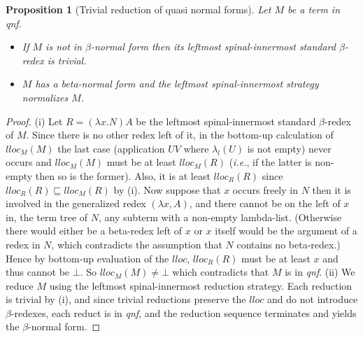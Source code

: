 \documentclass[xchauthor,chkrefs,GCNS,amsmath,amsthm,rotating,leaveRGB]{tcsg}
\theoremstyle{plain}
\newtheorem{proposition}[theorem]{Proposition}
\theoremstyle{definition}
\begin{document}
\begin{proposition}[Trivial reduction of quasi normal forms]\label{prop:qnf_nf}
Let $M$ be a term in \emph{qnf}.
%
\begin{itemize}[\textit{(ii)}]
\item[\textit{(i)}] If $M$ is not in $\beta $-normal form then its \emph{leftmost
    spinal-innermost standard $\beta $-redex} is trivial.
\item[\textit{(ii)}] $M$ has a beta-normal form and the leftmost spinal-innermost
    strategy normalizes $M$.
\end{itemize}
\end{proposition}

\begin{proof}
(i) Let $R = (\lambda x . N) A$ be the leftmost spinal-innermost standard
$\beta $-redex of $M$. Since there is no other redex left of it, in the
bottom-up calculation of $lloc_{M}(M)$ the last case (application $UV$ where
$\lambda _{l}(U)$ is not empty) never occurs and $lloc_{M}(M)$  must be at
least $lloc_{M}(R)$ (\textit{i.e.}, if the latter is non-empty then so is the
former). Also, it is at least $lloc_{R}(R)$ since $lloc_{R}(R) \sqsubseteq
lloc_{M}(R)$ by (i). Now suppose
that $x$ occurs freely in $N$ then it is involved in the generalized redex
$(\lambda x, A)$, and there cannot be on the left of $x$ in, the term tree of
$N$, any subterm with a non-empty lambda-list. (Otherwise there would either
be a beta-redex left of $x$ or $x$ itself would be the argument of a redex in
$N$, which contradicts the assumption that $N$ contains no beta-redex.) Hence
by bottom-up evaluation of the $lloc$, $lloc_{R}(R)$ must be at least $x$ and
thus cannot be $\bot $. So $lloc_{M}(M) \ne \bot $ which contradicts that $M$
is in \emph{qnf}. (ii) We reduce $M$ using the leftmost spinal-innermost
reduction strategy. Each reduction is trivial by (i), and since trivial
reductions preserve the $lloc$ and do not introduce $\beta $-redexes, each
reduct is in \emph{qnf}, and the reduction sequence terminates and yields the
$\beta $-normal form.
\end{proof}
\end{document}
